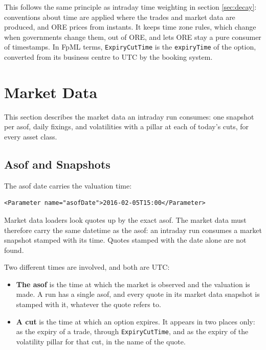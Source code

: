 \documentclass[12pt, a4paper]{article}
\begin{document}
This follows the same principle as intraday time weighting in section \ref{sec:decay}: conventions about time are applied
where the trades and market data are produced, and ORE prices from instants. It keeps time zone rules, which change
when governments change them, out of ORE, and lets ORE stay a pure consumer of timestamps. In FpML terms,
\texttt{ExpiryCutTime} is the \texttt{expiryTime} of the option, converted from its business centre to UTC by the
booking system.

\section{Market Data}\label{sec:mktdata}

This section describes the market data an intraday run consumes: one snapshot per asof, daily fixings, and
volatilities with a pillar at each of today's cuts, for every asset class.

\subsection{Asof and Snapshots}\label{sec:asofcuts}

The asof date carries the valuation time:

\begin{verbatim}
<Parameter name="asofDate">2016-02-05T15:00</Parameter>
\end{verbatim}

Market data loaders look quotes up by the exact asof. The market data must therefore carry the same datetime as the
asof: an intraday run consumes a market snapshot stamped with its time. Quotes stamped with the date alone are not
found.

Two different times are involved, and both are UTC:

\begin{itemize}
\item \textbf{The asof} is the time at which the market is observed and the valuation is made. A run has a single
  asof, and every quote in its market data snapshot is stamped with it, whatever the quote refers to.
\item \textbf{A cut} is the time at which an option expires. It appears in two places only: as the expiry of a trade,
  through \texttt{ExpiryCutTime}, and as the expiry of the volatility pillar for that cut, in the name of the quote.
\end{itemize}
\end{document}
